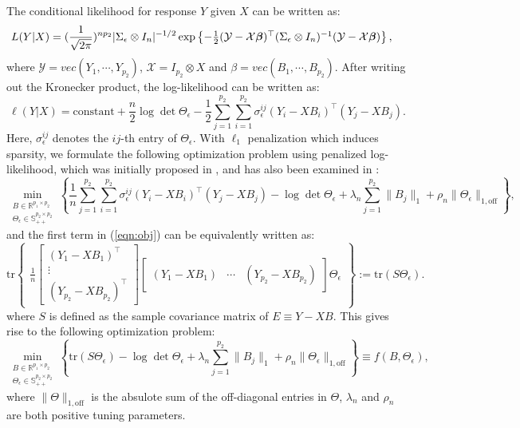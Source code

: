The conditional likelihood for response $Y$ given $X$ can be written as:
\begin{eqnarray*}
L(Y|X) & = (\frac{1}{\sqrt{2\pi}})^{n{p_2}} |\Sigma_\epsilon\otimes I_n|^{-1/2}\exp\begin{Bmatrix}-\frac{1}{2} (\mathcal{Y}-\mathcal{X}\boldsymbol{\beta})^\top(\Sigma_\epsilon\otimes I_n)^{-1}(\mathcal{Y}-\mathcal{X}\boldsymbol{\beta})  \end{Bmatrix},
\end{eqnarray*}
where $\mathcal{Y} = vec(Y_1,\cdots,Y_{p_2})$, $\mathcal{X}=I_{p_2}\otimes X$ and $\beta=vec(B_1,\cdots,B_{p_2})$. After writing out the Kronecker product, the log-likelihood can be written as:
\begin{equation*}
\ell (Y|X) = \text{constant}+\frac{n}{2}\log\det\Theta_\epsilon-\frac{1}{2}\sum_{j=1}^{p_2}\sum_{i=1}^{p_2}\sigma^{ij}_\epsilon(Y_i-XB_i)^\top(Y_j-XB_j).
\end{equation*}
Here, $\sigma^{ij}_{\epsilon}$ denotes the $ij$-th entry of $\Theta_\epsilon$. With $\ell_1$ penalization which induces sparsity, we formulate the following optimization problem using penalized log-likelihood, which was initially proposed in \citet{rothman2010sparse}, and has also been examined in \citet{lee2012simultaneous}:
\begin{equation}\label{eqn:obj}
\min\limits_{\substack{B\in\mathbb{R}^{p_1\times p_2} \\ \Theta_\epsilon\in \mathbb{S}_{++}^{p_2\times p_2}}} \left\{
\frac{1}{n}\sum_{j=1}^{p_2}\sum_{i=1}^{p_2} \sigma_\epsilon^{ij}(Y_i-XB_i)^\top(Y_j-XB_j)-\log\det \Theta_\epsilon + \lambda_n\sum_{j=1}^{p_2} \|B_j\|_1 + \rho_n \|\Theta_\epsilon\|_{1,\text{off}} \right\},
\end{equation}
and the first term in (\ref{eqn:obj}) can be equivalently written as:
\begin{equation*}
\text{tr}\begin{Bmatrix}\frac{1}{n}\begin{bmatrix}
(Y_1-XB_1)^\top \\  \vdots \\ (Y_{p_2}-XB_{p_2})^\top  
\end{bmatrix} \begin{bmatrix}
(Y_1-XB_1) & \cdots & (Y_{p_2}-XB_{p_2})
\end{bmatrix}\Theta_\epsilon \end{Bmatrix}:=\text{tr}(S\Theta_\epsilon).
\end{equation*}
where $S$ is defined as the sample covariance matrix of $E\equiv Y-XB$. This gives rise to the following optimization problem:
\begin{equation}\label{eqn:obj2}
\min\limits_{\substack{B\in\mathbb{R}^{p_1\times p_2} \\\Theta_\epsilon\in \mathbb{S}_{++}^{p_2\times p_2}}}  \left\{ \text{tr}(S\Theta_\epsilon) - \log\det\Theta_\epsilon +  \lambda_n\sum_{j=1}^{p_2} \|B_j\|_1 + \rho_n \|\Theta_\epsilon\|_{1,\text{off}} \right\}\equiv f(B,\Theta_\epsilon),
\end{equation}
where $\|\Theta\|_{1,\text{off}}$ is the absulote sum of the off-diagonal entries in $\Theta$, $\lambda_n$ and $\rho_n$ are both positive tuning parameters. 

